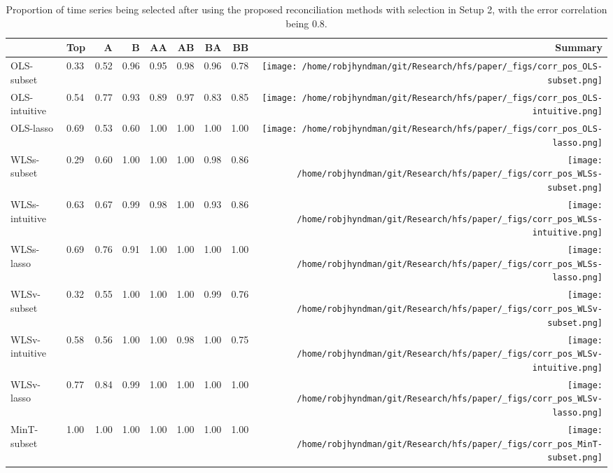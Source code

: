\documentclass[
  12pt,
  11pt]{article}
\begin{document}
\hypertarget{tbl-corr-selection-pos}{}
\begin{table}[!h]
\caption{\label{tbl-corr-selection-pos}Proportion of time series being selected after using the proposed
reconciliation methods with selection in Setup 2, with the error
correlation being 0.8. }\tabularnewline

\centering\begingroup\fontsize{11}{13}\selectfont

\begin{threeparttable}
\begin{tabular}{llrrrrrr>{}r}
\toprule
  & Top & A & B & AA & AB & BA & BB & Summary\\
\midrule
OLS-subset & 0.33 & 0.52 & 0.96 & 0.95 & 0.98 & 0.96 & 0.78 & \texttt{[image: /home/robjhyndman/git/Research/hfs/paper/\_figs/corr\_pos\_OLS-subset.png]}\\
OLS-intuitive & 0.54 & 0.77 & 0.93 & 0.89 & 0.97 & 0.83 & 0.85 & \texttt{[image: /home/robjhyndman/git/Research/hfs/paper/\_figs/corr\_pos\_OLS-intuitive.png]}\\
OLS-lasso & 0.69 & 0.53 & 0.60 & 1.00 & 1.00 & 1.00 & 1.00 & \texttt{[image: /home/robjhyndman/git/Research/hfs/paper/\_figs/corr\_pos\_OLS-lasso.png]}\\
\midrule
WLSs-subset & 0.29 & 0.60 & 1.00 & 1.00 & 1.00 & 0.98 & 0.86 & \texttt{[image: /home/robjhyndman/git/Research/hfs/paper/\_figs/corr\_pos\_WLSs-subset.png]}\\
WLSs-intuitive & 0.63 & 0.67 & 0.99 & 0.98 & 1.00 & 0.93 & 0.86 & \texttt{[image: /home/robjhyndman/git/Research/hfs/paper/\_figs/corr\_pos\_WLSs-intuitive.png]}\\
WLSs-lasso & 0.69 & 0.76 & 0.91 & 1.00 & 1.00 & 1.00 & 1.00 & \texttt{[image: /home/robjhyndman/git/Research/hfs/paper/\_figs/corr\_pos\_WLSs-lasso.png]}\\
\midrule
WLSv-subset & 0.32 & 0.55 & 1.00 & 1.00 & 1.00 & 0.99 & 0.76 & \texttt{[image: /home/robjhyndman/git/Research/hfs/paper/\_figs/corr\_pos\_WLSv-subset.png]}\\
WLSv-intuitive & 0.58 & 0.56 & 1.00 & 1.00 & 0.98 & 1.00 & 0.75 & \texttt{[image: /home/robjhyndman/git/Research/hfs/paper/\_figs/corr\_pos\_WLSv-intuitive.png]}\\
WLSv-lasso & 0.77 & 0.84 & 0.99 & 1.00 & 1.00 & 1.00 & 1.00 & \texttt{[image: /home/robjhyndman/git/Research/hfs/paper/\_figs/corr\_pos\_WLSv-lasso.png]}\\
\midrule
MinT-subset & 1.00 & 1.00 & 1.00 & 1.00 & 1.00 & 1.00 & 1.00 & \texttt{[image: /home/robjhyndman/git/Research/hfs/paper/\_figs/corr\_pos\_MinT-subset.png]}\\

\end{tabular}
\end{threeparttable}
\end{table}
\end{document}
